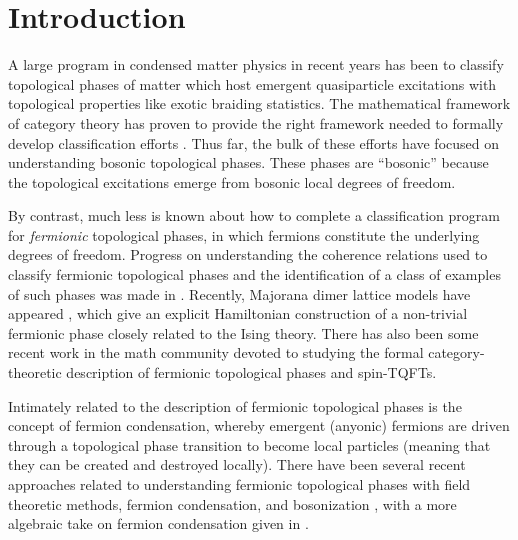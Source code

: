 
\section{Introduction}


A large program in condensed matter physics in recent years has been to classify 
topological phases of matter which host emergent quasiparticle excitations 
with topological properties like exotic braiding statistics. 
The mathematical framework of category theory has proven to provide the right 
framework needed to formally develop classification efforts \cite{kitaev2006}. 
Thus far, the bulk of these efforts have focused on understanding bosonic topological phases.
These phases are ``bosonic'' because the topological excitations emerge from bosonic 
local degrees of freedom.

By contrast, much less is known about how to complete a classification program for {\it fermionic} topological phases, in which fermions constitute 
the underlying degrees of freedom. 
Progress on understanding the coherence relations used to classify fermionic topological phases and the identification of a class of examples of such phases was made in \cite{gu2015,gu2014,Lan2016b}. 
Recently, Majorana dimer lattice models have appeared \cite{ware2016,tarantino2016}, 
which give an explicit Hamiltonian construction of a 
non-trivial
fermionic phase closely related to the Ising theory. 
There has also been some recent work in the math community \cite{usher2016,brundan2016,bruillard2017,bonderson2017} 
devoted to studying the formal category-theoretic description of fermionic topological phases and spin-TQFTs. 

Intimately related to the description of fermionic topological phases is the concept of fermion condensation, 
whereby emergent (anyonic) fermions are driven through a topological phase transition to become 
local particles (meaning that they can be created and destroyed locally). 
There have been several recent approaches related to understanding 
fermionic topological phases with field theoretic methods, fermion condensation, and bosonization \cite{gaiotto2016, bhardwaj2016, bhardwaj2016b,kapustin2017,putrov2016}, 
with a more algebraic take on fermion condensation given in \cite{wan2016}. 


